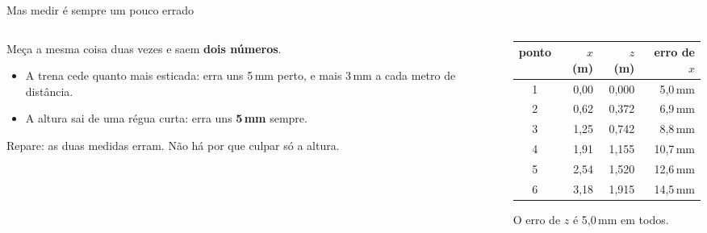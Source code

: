\documentclass[aspectratio=169,11pt]{beamer}
\newcommand{\bnum}[1]{\textbf{\textcolor{mTeal}{#1}}}
\begin{document}
\begin{frame}{Mas medir é sempre um pouco errado}
  \begin{columns}[T]
    \begin{column}{0.50\textwidth}
      Meça a mesma coisa duas vezes e saem \bnum{dois números}.
      \medskip

      \begin{itemize}
        \item A trena \alert{cede} quanto mais esticada: erra uns 5\,mm perto, e mais
              3\,mm a cada metro de distância.
        \item A altura sai de uma régua curta: erra uns \bnum{5\,mm} sempre.
      \end{itemize}
      \medskip

      Repare: \alert{as duas medidas erram}. Não há por que culpar só a altura.
    \end{column}
    \begin{column}{0.46\textwidth}
      \centering
      \small
      \renewcommand{\arraystretch}{1.15}
      \begin{tabular}{crrr}
        \toprule
        ponto & $x$ (m) & $z$ (m) & erro de $x$ \\
        \midrule
        1 & 0,00 & 0,000 & 5,0\,mm \\
        2 & 0,62 & 0,372 & 6,9\,mm \\
        3 & 1,25 & 0,742 & 8,8\,mm \\
        4 & 1,91 & 1,155 & 10,7\,mm \\
        5 & 2,54 & 1,520 & 12,6\,mm \\
        6 & 3,18 & 1,915 & 14,5\,mm \\
        \bottomrule
      \end{tabular}
      \smallskip

      {\scriptsize\textcolor{mStoneMid}{O erro de $z$ é 5,0\,mm em todos.}}
    \end{column}
  \end{columns}
\end{frame}
\end{document}
